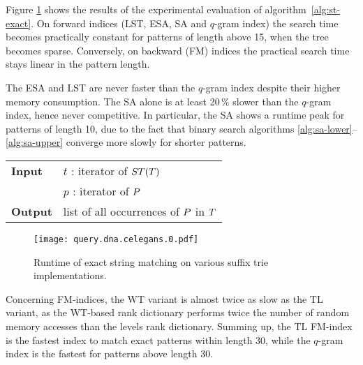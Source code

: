 Figure \ref{fig:query-dna-exact} shows the results of the experimental evaluation of algorithm~\ref{alg:st-exact}.
On forward indices (LST, ESA, SA and $q$-gram index) the search time becomes practically constant for patterns of length above 15, \ie when the tree becomes sparse.
Conversely, on backward (FM) indices the practical search time stays linear in the pattern length. 

The ESA and LST are never faster than the $q$-gram index despite their higher memory consumption.
The SA alone is at least 20\,\% slower than the $q$-gram index, hence never competitive.
In particular, the SA shows a runtime peak for patterns of length 10, due to the fact that binary search algorithms \ref{alg:sa-lower}--\ref{alg:sa-upper} converge more slowly for shorter patterns.

\begin{figure*}[t]
\begin{center}
\begin{minipage}[t]{.8\textwidth}
\begin{algorithm}[H]
\begin{tabular}{ll}
\textbf{Input}  & $t$ : iterator of $ST(T)$\\
				& $p$ : iterator of $P$\\
\textbf{Output} & list of all occurrences of $P$ in $T$\\
\end{tabular}
\begin{algorithmic}[1]
	\State \Report {}
		\State {}
\EndIf
\end{algorithmic}
\label{alg:st-exact}
\end{algorithm}
\end{minipage}
\end{center}
\end{figure*}

\begin{figure}[b]
\begin{center}
\caption[Exact string matching runtime]{Runtime of exact string matching on various suffix trie implementations.}
\label{fig:query-dna-exact}
\texttt{[image: query.dna.celegans.0.pdf]}
\end{center}
\end{figure}


Concerning FM-indices, the WT variant is almost twice as slow as the TL variant, as the WT-based rank dictionary performs twice the number of random memory accesses than the levels rank dictionary.
Summing up, the TL FM-index is the fastest index to match exact patterns within length 30, while the $q$-gram index is the fastest for patterns above length 30.

